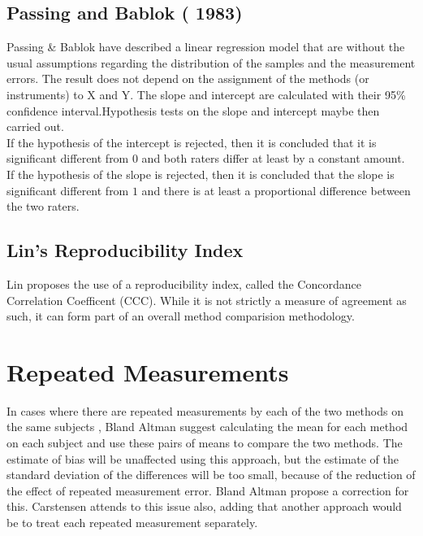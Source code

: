 \documentclass[12pt, a4paper]{report}
\theoremstyle{plain}
\theoremstyle{definition}
\theoremstyle{remark}
\begin{document}
	\subsection{Passing and Bablok ( 1983) }
	Passing \& Bablok have described a linear regression model that
	are without the usual assumptions regarding the distribution of
	the samples and the measurement errors. The result does not depend
	on the assignment of the methods (or instruments) to X and Y. The
	slope and intercept  are calculated with their 95\% confidence
	interval.Hypothesis tests on the slope and intercept maybe then
	carried out.
	\\
	If the hypothesis of the intercept is rejected, then it is
	concluded that it is significant different from $0$ and both
	raters differ at least by a constant amount.
	\\
	If the hypothesis of the slope is rejected, then it is concluded
	that the slope is significant different from $1$ and there is at
	least a proportional difference between the two raters.
	
	\subsection{Lin's Reproducibility Index} Lin proposes the use of a
	reproducibility index, called the Concordance Correlation
	Coefficent (CCC). While it is not strictly a measure of agreement
	as such, it can form part of an overall method comparision
	methodology.

	\section{Repeated Measurements}
	
	In cases where there are repeated measurements by each of the two
	methods on the same subjects , Bland Altman suggest calculating
	the mean for each method on each subject and use these pairs of
	means to compare the two methods.
	The estimate of bias will be unaffected using this approach, but
	the estimate of the standard deviation of the differences will be
	too small, because of the reduction of the effect of repeated
	measurement error. Bland Altman propose a correction for this.
	Carstensen attends to this issue also, adding that another
	approach would be to treat each repeated measurement separately.
	
	
	
\end{document}
